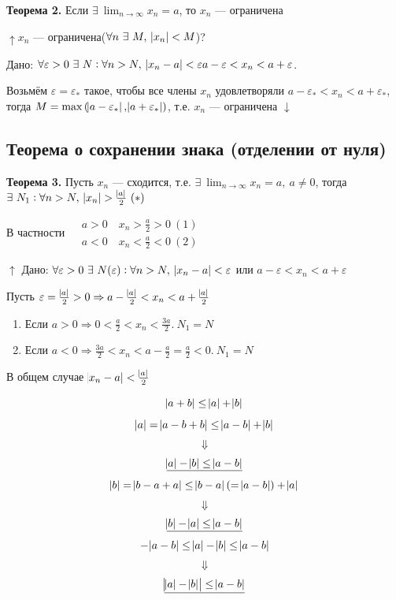 \documentclass{article}
\begin{document}
    \textbf{Теорема 2.} Если \(\exists\ \lim_{n \rightarrow \infty}{x_n} = a\), то \(x_n\) --- ограничена
    
    \(\uparrow x_n\) --- ограничена(\(\forall n\ \exists\ M,\ \abs{x_n} < M\))?
    
    Дано: \(\forall \varepsilon > 0\ \exists\ N : \forall n > N,\ \abs{x_n - a} < \varepsilon\\ a - \varepsilon < x_n < a + \varepsilon\).
    
    Возьмём \(\varepsilon = \varepsilon_*\) такое, чтобы все члены \(x_n\) удовлетворяли \(a - \varepsilon_* < x_n < a + \varepsilon_*\),\\
    тогда \(M = \max{(\abs{a - \varepsilon_*}, \abs{a + \varepsilon_*})}\), т.е. \(x_n\) --- ограничена \(\downarrow\)
    
    \subsection{Теорема о сохранении знака (отделении от нуля)}
    
    \textbf{Теорема 3.} Пусть \(x_n\) --- сходится, т.е. \(\exists\ \lim_{n \rightarrow \infty}{x_n} = a,\ a \not = 0\), тогда \(\exists\ N_1 : \forall n > N,\ \abs{x_n} > \frac{\abs{a}}{2}\ (*)\)
    
    В частности \(\begin{aligned}
    	&a > 0 \quad x_n > \frac{a}{2} > 0\ (1)\\
        &a < 0 \quad x_n < \frac{a}{2} < 0\ (2)
    \end{aligned}\)
    
    \(\uparrow\) Дано: \(\forall \varepsilon > 0\ \exists\ N(\varepsilon) : \forall n > N,\ \abs{x_n - a} < \varepsilon\) или \(a - \varepsilon < x_n < a + \varepsilon\)
    
    Пусть \(\varepsilon = \frac{\abs{a}}{2} > 0 \Rightarrow a - \frac{\abs{a}}{2} < x_n < a + \frac{\abs{a}}{2}\)
    \begin{enumerate}
    	\item Если \(a > 0 \Rightarrow 0 < \frac{a}{2} < x_n < \frac{3a}{2}.\ N_1 = N\)
        \item Если \(a < 0 \Rightarrow \frac{3a}{2} < x_n < a - \frac{a}{2} = \frac{a}{2} < 0.\ N_1 = N\)
    \end{enumerate}
    
    В общем случае \(\abs{x_n - a} < \frac{\abs{a}}{2}\)
    
    \[\abs{a + b} \leq \abs{a} + \abs{b}\]
    \[\abs{a} = \abs{a - b + b} \leq \abs{a - b} + \abs{b}\]
    \[\Downarrow\]
    \[\underline{\abs{a} - \abs{b} \leq \abs{a - b}}\]
    \[\abs{b} = \abs{b - a + a} \leq \abs{b - a}(= \abs{a - b}) + \abs{a}\]
    \[\Downarrow\]
    \[\underline{\abs{b} - \abs{a} \leq \abs{a - b}}\]
    \[-\abs{a-b} \leq \abs{a} - \abs{b} \leq \abs{a - b}\]
    \[\Downarrow\]
    \[\underline{\abs{\abs{a} - \abs{b}} \leq \abs{a - b}}\]
    
\end{document}
